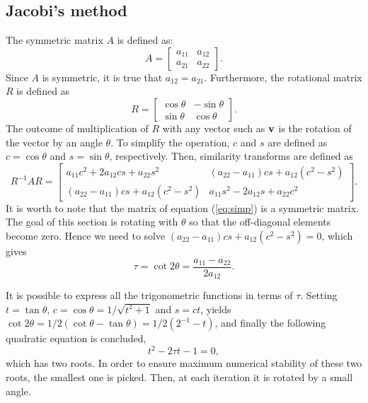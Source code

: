 \documentclass[12pt, a4paper, reqno, article]{amsart}
\begin{document}
\subsection{Jacobi's method}
The symmetric matrix $A$ is defined as:
\begin{equation}
A = \begin{bmatrix}
a_{11} & a_{12} \\
a_{21} & a_{22}
\end{bmatrix}.
\end{equation}
Since $A$ is symmetric, it is true that $a_{12}=a_{21}$. Furthermore, the rotational matrix $R$ is defined as
\begin{equation}
R = \begin{bmatrix}
\cos{\theta} & -\sin{\theta} \\
\sin{\theta} & \cos{\theta}
\end{bmatrix}.
\end{equation}
The outcome of multiplication of $R$ with any vector such as $\vb{v}$ is the rotation of the vector by an angle $\theta$. To simplify the operation, $c$ and $s$ are defined as $c=\cos{\theta}$ and $s=\sin{\theta}$, respectively. Then, similarity transforms are defined as
\begin{equation}
R^{-1}AR=\begin{bmatrix}
a_{11}c^2+2a_{12}cs + a_{22}s^2 & (a_{22}-a_{11})cs+a_{12}(c^2-s^2) \\
(a_{22}-a_{11})cs + a_{12}(c^2-s^2) & a_{11}s^2-2a_{12}s+a_{22}c^2
\end{bmatrix}.
\end{equation}
It is worth to note that the matrix of equation (\ref{eq:simp}) is a symmetric matrix. The goal of this section is rotating with $\theta$ so that the off-diagonal elements become zero. Hence we need to solve $(a_{22}-a_{11})cs + a_{12}(c^2-s^2)=0$, which gives
\begin{equation}
\tau = \cot{2\theta} = \frac{a_{11}-a_{22}}{2a_{12}}.
\end{equation}

It is possible to express all the trigonometric functions in terms of $\tau$. Setting $t = \tan{\theta}$, $c=\cos{\theta}=1/\sqrt{t^2+1}$ and $s=ct$, yields $\cot{2\theta}=1/2(\cot{\theta}-\tan{\theta}) = 1/2(2^{-1}-t)$, and finally the following quadratic equation is concluded,
\begin{equation}
t^2-2\tau t-1 =0,
\end{equation}
which has two roots. In order to ensure maximum numerical stability of these two roots, the smallest one is picked. Then, at each iteration it is rotated by a small angle.
\end{document}
